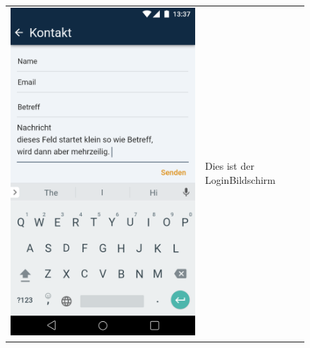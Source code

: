 \begin{figure}[h]
\begin{tabularx}{\textwidth}{X | X}
	\includegraphics[scale = 0.22]{img/AndroidMockup/contact} & Dies ist der LoginBildschirm \\ 
\end{tabularx}
\end{figure}

